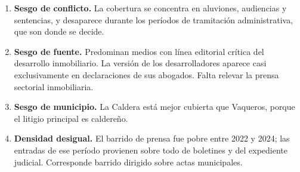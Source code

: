 \begin{enumerate}
\item \textbf{Sesgo de conflicto.} La cobertura se concentra en aluviones, audiencias y sentencias, y desaparece durante los períodos de tramitación administrativa, que son donde se decide.
\item \textbf{Sesgo de fuente.} Predominan medios con línea editorial crítica del desarrollo inmobiliario. La versión de los desarrolladores aparece casi exclusivamente en declaraciones de sus abogados. Falta relevar la prensa sectorial inmobiliaria.
\item \textbf{Sesgo de municipio.} La Caldera está mejor cubierta que Vaqueros, porque el litigio principal es caldereño.
\item \textbf{Densidad desigual.} El barrido de prensa fue pobre entre 2022 y 2024; las entradas de ese período provienen sobre todo de boletines y del expediente judicial. Corresponde barrido dirigido sobre actas municipales.
\end{enumerate}
